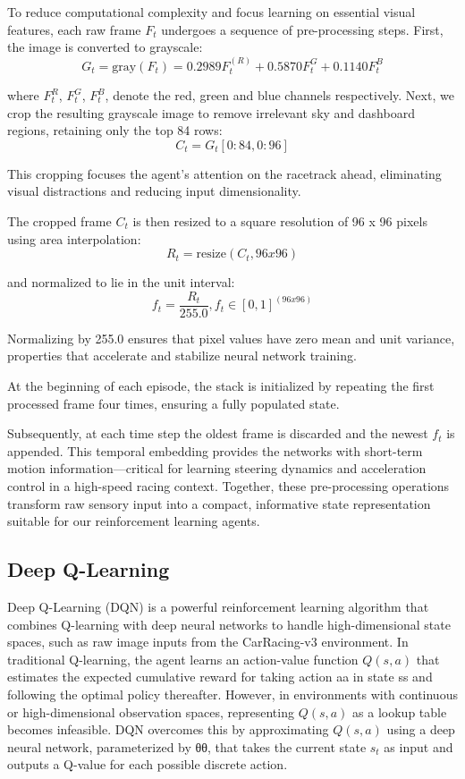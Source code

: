 \documentclass[conference]{IEEEtran}
\begin{document}
To reduce computational complexity and focus learning on essential visual features, each raw frame $F_t$ undergoes a sequence of pre-processing steps. First, the image is converted to grayscale: $$G_t = \text{gray}(F_t) = 0.2989F_{t}^{(R)} + 0.5870F_{t}^{G} + 0.1140F_{t}^{B}$$

where $F_t^R$, $F_t^G$, $F_t^B$, denote the red, green and blue channels respectively. Next, we crop the resulting grayscale image to remove irrelevant sky and dashboard regions, retaining only the top 84 rows: $$C_t = G_t[0 : 84, 0 : 96]$$

This cropping focuses the agent’s attention on the racetrack ahead, eliminating visual distractions and reducing input dimensionality.

The cropped frame $C_t$ is then resized to a square resolution of 96 x 96 pixels using area interpolation: $$R_t = \text{resize}(C_t, 96 x 96)$$

and normalized to lie in the unit interval: $$f_t = \frac{R_t}{255.0}, f_t \in [0, 1]^{(96x96)}$$

Normalizing by 255.0 ensures that pixel values have zero mean and unit variance, properties that accelerate and stabilize neural network training.

At the beginning of each episode, the stack is initialized by repeating the first processed frame four times, ensuring a fully populated state. 

Subsequently, at each time step the oldest frame is discarded and the newest $f_t$ is appended. This temporal embedding provides the networks with short-term motion information—critical for learning steering dynamics and acceleration control in a high-speed racing context. Together, these pre-processing operations transform raw sensory input into a compact, informative state representation suitable for our reinforcement learning agents.

\subsection{Deep Q-Learning}
Deep Q-Learning (DQN) is a powerful reinforcement learning algorithm that combines Q-learning with deep neural networks to handle high-dimensional state spaces, such as raw image inputs from the CarRacing-v3 environment. In traditional Q-learning, the agent learns an action-value function $Q(s, a)$ that estimates the expected cumulative reward for taking action aa in state ss and following the optimal policy thereafter. However, in environments with continuous or high-dimensional observation spaces, representing $Q(s, a)$ as a lookup table becomes infeasible. DQN overcomes this by approximating $Q(s, a)$ using a deep neural network, parameterized by θθ, that takes the current state $s_t$ as input and outputs a Q-value for each possible discrete action.
\end{document}
